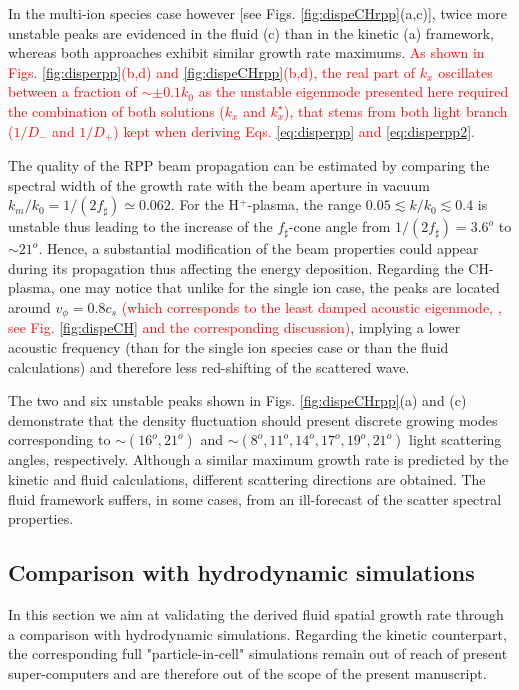 \documentclass[
 reprint,
 superscriptaddress,
 amsmath,amssymb,
 aps,
]{revtex4-1}
\def\tc{\textcolor{red}}
\begin{document}
In the multi-ion species case however [see Figs. \ref{fig:dispeCHrpp}(a,c)],
twice more unstable peaks are evidenced in the fluid  (c) than in the kinetic (a) framework, whereas both approaches exhibit  similar growth rate maximums. 
\tc{
As shown in Figs. \ref{fig:disperpp}(b,d) and \ref{fig:dispeCHrpp}(b,d),  the real part of $k_x$   oscillates between a fraction of $\sim \pm0.1k_0$ as the unstable eigenmode  presented here required the   combination of both solutions ($k_x$ and $k_x^\star$), that stems from both light branch ($1/D_-$ and $1/D_+$) kept when deriving Eqs. \eqref{eq:disperpp} and  \eqref{eq:disperpp2}. 
}

The quality of the RPP beam propagation can be estimated by comparing the spectral width of the growth rate  with the  beam aperture in vacuum $k_m/k_0=1/(2f_\sharp) \simeq 0.062$.
For the H$^+$-plasma, 
the range  $0.05 \lesssim k/k_0\lesssim 0.4$ 
is unstable thus  
leading to the increase of the $f_\sharp$-cone 
angle from $1/(2f_\sharp)=3.6^o$ to $\sim 21^o$.
Hence, a substantial modification of the beam 
properties  could appear during its propagation thus affecting the energy deposition.
Regarding the CH-plasma, one may notice that unlike for the single ion case, the peaks are located around $v_\phi=0.8c_s$ \tc{(which corresponds to the least damped acoustic eigenmode, \cite[]{POF_Fried_71,POP_Williams_95}, see Fig. \ref{fig:dispeCH} and the corresponding discussion)}, implying a lower acoustic frequency (than for the single ion species case or than the fluid calculations) and therefore less red-shifting of the scattered wave.

The two and six unstable peaks shown  in  Figs. \ref{fig:dispeCHrpp}(a) and (c) demonstrate that the density fluctuation should present discrete  growing modes corresponding to $\sim (16^o,21^o)$ and $ \sim (8^o,11^o,14^o,17^o,19^o,21^o)$ light scattering angles, respectively.
Although a similar maximum growth rate is predicted by the kinetic and fluid calculations, different scattering directions are obtained. The fluid framework  suffers, in some cases, from an ill-forecast of the scatter spectral properties. 

\subsection{Comparison with hydrodynamic simulations}
In this section we aim at validating the derived fluid spatial growth rate through a  comparison with hydrodynamic simulations. Regarding the kinetic counterpart, the corresponding full "particle-in-cell" simulations remain out of reach of present super-computers and are therefore out of the scope of the present manuscript. 
\end{document}

